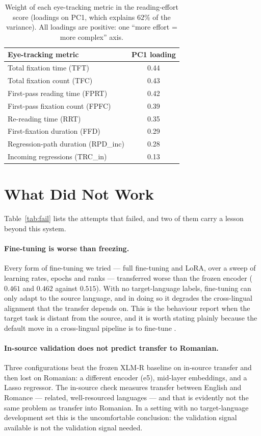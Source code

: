 \documentclass[11pt]{article}
\begin{document}
\begin{table}[tbp]
\centering\small
\begin{tabular}{lc}
\toprule
\textbf{Eye-tracking metric} & \textbf{PC1 loading} \\
\midrule
Total fixation time (TFT) & 0.44 \\
Total fixation count (TFC) & 0.43 \\
First-pass reading time (FPRT) & 0.42 \\
First-pass fixation count (FPFC) & 0.39 \\
Re-reading time (RRT) & 0.35 \\
First-fixation duration (FFD) & 0.29 \\
Regression-path duration (RPD\_inc) & 0.28 \\
Incoming regressions (TRC\_in) & 0.13 \\
\bottomrule
\end{tabular}
\caption{Weight of each eye-tracking metric in the reading-effort score (loadings on PC1, which explains $62\%$ of
the variance). All loadings are positive: one ``more effort = more complex'' axis.}
\label{tab:pca}
\end{table}

\section{What Did Not Work}
\label{sec:negative}

Table~\ref{tab:fail} lists the attempts that failed, and two of them
carry a lesson beyond this system.

\paragraph{Fine-tuning is worse than freezing.}
Every form of fine-tuning we tried --- full fine-tuning and LoRA, over
a sweep of learning rates, epochs and ranks --- transferred worse than
the frozen encoder ($0.461$ and $0.462$ against $0.515$). With no
target-language labels, fine-tuning can only adapt to the source
language, and in doing so it degrades the cross-lingual alignment that
the transfer depends on. This is the behaviour \citet{peters-etal-2019-tune}
report when the target task is distant from the source, and it is worth
stating plainly because the default move in a cross-lingual pipeline is
to fine-tune \citep{pires-etal-2019-multilingual}.

\paragraph{In-source validation does not predict transfer to Romanian.}
Three configurations beat the frozen XLM-R baseline on in-source
transfer and then lost on Romanian: a different encoder (e5), mid-layer
embeddings, and a Lasso regressor. The in-source check measures
transfer between English and Romance --- related, well-resourced
languages --- and that is evidently not the same problem as transfer
into Romanian. In a setting with no target-language development set
this is the uncomfortable conclusion: the validation signal available
is not the validation signal needed.
\end{document}
